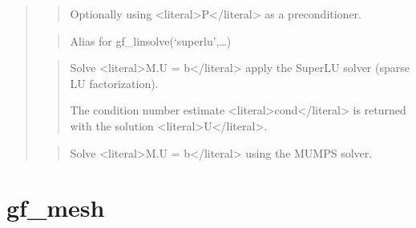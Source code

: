\documentclass[a4paper,11pt,english]{sphinxmanual}
\begin{document}
\begin{quote}
\begin{quote}
\sphinxAtStartPar
Optionally using \textless{}literal\textgreater{}P\textless{}/literal\textgreater{} as a preconditioner.
\end{quote}

\sphinxAtStartPar
{}
\begin{quote}

\sphinxAtStartPar
Alias for gf\_linsolve(‘superlu’,…)
\end{quote}

\sphinxAtStartPar
{}
\begin{quote}

\sphinxAtStartPar
Solve \textless{}literal\textgreater{}M.U = b\textless{}/literal\textgreater{} apply the SuperLU solver (sparse LU factorization).

\sphinxAtStartPar
The condition number estimate \textless{}literal\textgreater{}cond\textless{}/literal\textgreater{} is returned with the solution \textless{}literal\textgreater{}U\textless{}/literal\textgreater{}.
\end{quote}

\sphinxAtStartPar
{}
\begin{quote}

\sphinxAtStartPar
Solve \textless{}literal\textgreater{}M.U = b\textless{}/literal\textgreater{} using the MUMPS solver.
\end{quote}
\end{quote}


\section{gf\_mesh}
\label{\detokenize{scilab/cmdref_gf_mesh:gf-mesh}}\label{\detokenize{scilab/cmdref_gf_mesh::doc}}
\sphinxAtStartPar
{}
\end{document}
